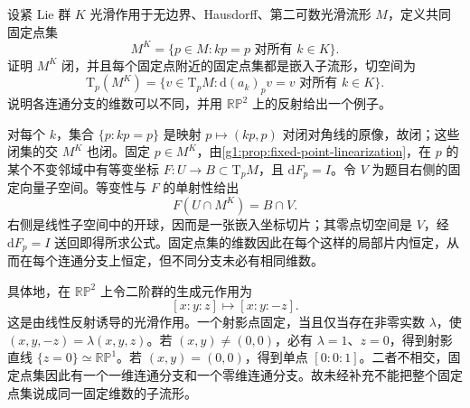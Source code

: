 \begin{exercise}\label{g1:ex:compact-action-fixed-set}
	设紧 Lie 群 \(K\) 光滑作用于无边界、Hausdorff、第二可数光滑流形 \(M\)，定义共同固定点集
	\[
		M^K=\{p\in M:kp=p\text{ 对所有 }k\in K\}.
	\]
	证明 \(M^K\) 闭，并且每个固定点附近的固定点集都是嵌入子流形，切空间为
	\[
		\mathrm{T}_p(M^K)=\{v\in \mathrm{T}_pM:\mathrm{d}(a_k)_pv=v\text{ 对所有 }k\in K\}.
	\]
	说明各连通分支的维数可以不同，并用 \(\mathbb{RP}^2\) 上的反射给出一个例子。
\end{exercise}
\begin{solution}
	对每个 \(k\)，集合 \(\{p:kp=p\}\) 是映射 \(p\mapsto(kp,p)\) 对闭对角线的原像，故闭；这些闭集的交 \(M^K\) 也闭。固定 \(p\in M^K\)，由\cref{g1:prop:fixed-point-linearization}，在 \(p\) 的某个不变邻域中有等变坐标 \(F:U\to B\subset \mathrm{T}_pM\)，且 \(\mathrm{d}F_p=I\)。令 \(V\) 为题目右侧的固定向量子空间。等变性与 \(F\) 的单射性给出
	\[
		F(U\cap M^K)=B\cap V.
	\]
	右侧是线性子空间中的开球，因而是一张嵌入坐标切片；其零点切空间是 \(V\)，经 \(\mathrm{d}F_p=I\) 送回即得所求公式。固定点集的维数因此在每个这样的局部片内恒定，从而在每个连通分支上恒定，但不同分支未必有相同维数。

	具体地，在 \(\mathbb{RP}^2\) 上令二阶群的生成元作用为
	\[
		[x:y:z]\longmapsto[x:y:-z].
	\]
	这是由线性反射诱导的光滑作用。一个射影点固定，当且仅当存在非零实数 \(\lambda\)，使 \((x,y,-z)=\lambda(x,y,z)\)。若 \((x,y)\ne(0,0)\)，必有 \(\lambda=1\)、\(z=0\)，得到射影直线 \(\{z=0\}\simeq\mathbb{RP}^1\)。若 \((x,y)=(0,0)\)，得到单点 \([0:0:1]\)。二者不相交，固定点集因此有一个一维连通分支和一个零维连通分支。故未经补充不能把整个固定点集说成同一固定维数的子流形。
\end{solution}

